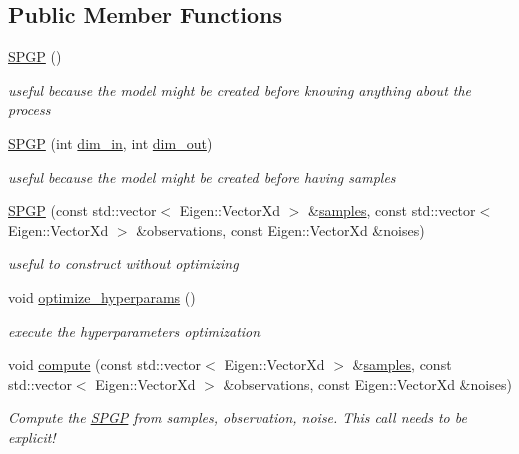 \subsection*{Public Member Functions}
\begin{DoxyCompactItemize}
\item 
\hyperlink{classlimbo_1_1model_1_1_s_p_g_p_a7052cad1d905c48e673f2a843d2643c9}{S\+P\+GP} ()
\begin{DoxyCompactList}\small\item\em useful because the model might be created before knowing anything about the process \end{DoxyCompactList}\item 
\hyperlink{classlimbo_1_1model_1_1_s_p_g_p_a6fe55238f690cfba7dc1de3e6ad25ac3}{S\+P\+GP} (int \hyperlink{classlimbo_1_1model_1_1_s_p_g_p_ab84d7663a814757766c2d630e0bacd9e}{dim\+\_\+in}, int \hyperlink{classlimbo_1_1model_1_1_s_p_g_p_a605b47cf6ecf50c2436cbad531099d16}{dim\+\_\+out})
\begin{DoxyCompactList}\small\item\em useful because the model might be created before having samples \end{DoxyCompactList}\item 
\hyperlink{classlimbo_1_1model_1_1_s_p_g_p_ada07822c26ef5b1f954af3650b5b3a93}{S\+P\+GP} (const std\+::vector$<$ Eigen\+::\+Vector\+Xd $>$ \&\hyperlink{classlimbo_1_1model_1_1_s_p_g_p_a867505eb41e8fe971eb7de28b2cea50f}{samples}, const std\+::vector$<$ Eigen\+::\+Vector\+Xd $>$ \&observations, const Eigen\+::\+Vector\+Xd \&noises)
\begin{DoxyCompactList}\small\item\em useful to construct without optimizing \end{DoxyCompactList}\item 
void \hyperlink{classlimbo_1_1model_1_1_s_p_g_p_a942a3f77cffebf2210203da69d2329d4}{optimize\+\_\+hyperparams} ()
\begin{DoxyCompactList}\small\item\em execute the hyperparameters optimization \end{DoxyCompactList}\item 
void \hyperlink{classlimbo_1_1model_1_1_s_p_g_p_ae947bef5bb27d3cc10bc4206cf552b45}{compute} (const std\+::vector$<$ Eigen\+::\+Vector\+Xd $>$ \&\hyperlink{classlimbo_1_1model_1_1_s_p_g_p_a867505eb41e8fe971eb7de28b2cea50f}{samples}, const std\+::vector$<$ Eigen\+::\+Vector\+Xd $>$ \&observations, const Eigen\+::\+Vector\+Xd \&noises)
\begin{DoxyCompactList}\small\item\em Compute the \hyperlink{classlimbo_1_1model_1_1_s_p_g_p}{S\+P\+GP} from samples, observation, noise. This call needs to be explicit! \end{DoxyCompactList}\item 

\end{DoxyCompactItemize}

